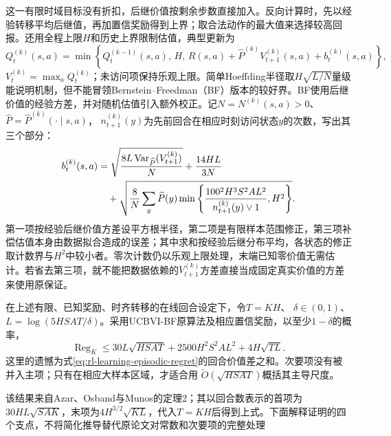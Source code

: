 这一有限时域目标没有折扣，后继价值按剩余步数直接加入。反向计算时，先以经验转移平均后继值，再加置信奖励得到上界；取合法动作的最大值来选择较高回报。还用全程上限$H$和历史上界限制估值，典型更新为
\[
 Q_t^{(k)}(s,a)
   =\min\left\{Q_t^{(k-1)}(s,a),\,H,\,
       R(s,a)+\widehat P^{(k)}V_{t+1}^{(k)}(s,a)
                         +b_t^{(k)}(s,a)\right\},
\]
$V_t^{(k)}=\max_aQ_t^{(k)}$；未访问项保持乐观上限。简单Hoeffding半径取$H\sqrt{L/N}$量级能说明机制，但不能冒领Bernstein--Freedman（BF）版本的较好界。BF使用后继价值的经验方差，并对随机估值引入额外校正。记$N=N^{(k)}(s,a)>0$、$\widehat P=\widehat P^{(k)}(\cdot\mid s,a)$，
$n_{t+1}^{(k)}(y)$为先前回合在相应时刻访问状态$y$的次数，写出其三个部分：
\begin{align}
 b_t^{(k)}(s,a)
  &=\sqrt{\frac{8L\operatorname{Var}_{\widehat P}
                                  (V_{t+1}^{(k)})}{N}}
       +\frac{14HL}{3N}\notag\\
  &\quad+\sqrt{\frac{8}{N}\sum_y\widehat P(y)
         \min\left\{
           \frac{100^2H^3S^2AL^2}{n_{t+1}^{(k)}(y)\vee1},H^2
                  \right\}} .
 \label{eq:rl-learning-ucbvi-bonus}
\end{align}
第一项按经验后继价值方差设平方根半径，第二项是有限样本范围修正，第三项补偿估值本身由数据拟合造成的误差；其中求和按经验后继分布平均，各状态的修正取计数界与$H^2$中较小者。零次计数仍以乐观上限处理，末端已知零价值无需估计。若省去第三项，就不能把数据依赖的$V_{t+1}^{(k)}$方差直接当成固定真实价值的方差来使用原保证。

\begin{theorem}
  \label{thm:rl-learning-ucbvi}
  在上述有限、已知奖励、时齐转移的在线回合设定下，令$T=KH$、
  $\delta\in(0,1)$、$L=\log(5HSAT/\delta)$。采用UCBVI-BF原算法及相应置信奖励，以至少$1-\delta$的概率，
  \begin{equation}
    \operatorname{Reg}_K
      \leq30L\sqrt{HSAT}
          +2500H^2S^2AL^2
          +4H\sqrt{TL}.
    \label{eq:rl-learning-ucbvi-bound}
  \end{equation}
  这里的遗憾为式\eqref{eq:rl-learning-episodic-regret}的回合价值差之和。次要项没有被并入主项；只有在相应大样本区域，才适合用
  $\widetilde O(\sqrt{HSAT})$概括其主导尺度。
\end{theorem}

该结果来自Azar、Osband与Munos的定理2；其以回合数表示的首项为$30HL\sqrt{SAK}$，末项为$4H^{3/2}\sqrt{KL}$，代入$T=KH$后得到上式。下面解释证明的四个支点，不将简化推导替代原论文对常数和次要项的完整处理

